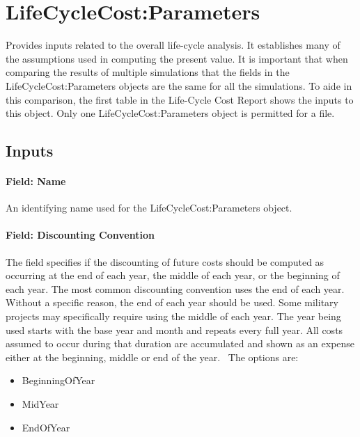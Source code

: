 \section{LifeCycleCost:Parameters}\label{lifecyclecostparameters}

Provides inputs related to the overall life-cycle analysis. It establishes many of the assumptions used in computing the present value. It is important that when comparing the results of multiple simulations that the fields in the LifeCycleCost:Parameters objects are the same for all the simulations. To aide in this comparison, the first table in the Life-Cycle Cost Report shows the inputs to this object. Only one LifeCycleCost:Parameters object is permitted for a file. 

\subsection{Inputs}\label{inputs-058}

\paragraph{Field: Name}\label{field-name-056}

An identifying name used for the LifeCycleCost:Parameters object.

\paragraph{Field: Discounting Convention}\label{field-discounting-convention}

The field specifies if the discounting of future costs should be computed as occurring at the end of each year, the middle of each year, or the beginning of each year. The most common discounting convention uses the end of each year. Without a specific reason, the end of each year should be used. Some military projects may specifically require using the middle of each year. The year being used starts with the base year and month and repeats every full year. All costs assumed to occur during that duration are accumulated and shown as an expense either at the beginning, middle or end of the year.~ The options are:

\begin{itemize}
\item
  BeginningOfYear
\item
  MidYear
\item
  EndOfYear
\end{itemize}

